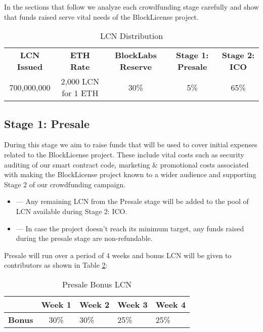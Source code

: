 In the sections that follow we analyze each crowdfunding stage carefully and show that funds raised serve vital needs of the BlockLicense project.


\begin{table}[t]
\begin{center}
\begin{tabular}{c c c c c}
& & \\ %
\toprule
\textbf{LCN Issued} & \textbf{ETH Rate} & \textbf{BlockLabs Reserve}  & \textbf{Stage 1: Presale} & \textbf{Stage 2: ICO} \\
\midrule
700,000,000 & 2,000 LCN for 1 ETH & 30\% & 5\% & 65\% \\
\bottomrule
\end{tabular}
\end{center}
\caption{LCN Distribution}
\label{table:coindistribution}
\end{table}



\subsection{Stage 1: Presale}


During this stage we aim to raise funds that will be used to cover initial expenses related to the BlockLicense project. These include vital costs such as security auditing of our smart contract code, marketing \& promotional costs associated with making the BlockLicense project known to a wider audience and supporting Stage 2 of our crowdfunding campaign.


\begin{itemize}
\item --- Any remaining LCN from the Presale stage will be added to the pool of LCN available during Stage 2: ICO.
\item --- In case the project doesn't reach its minimum target, any funds raised during the presale stage are non-refundable. 
\end{itemize}

Presale will run over a period of 4 weeks and bonus LCN will be given to contributors as shown in Table \ref{presale-bonus}:

\begin{table}[h]
\centering
\begin{tabular}{@{}lclll@{}}
\toprule
& \textbf{Week 1} & \multicolumn{1}{c}{\textbf{Week 2}} & \multicolumn{1}{c}{\textbf{Week 3}} & \multicolumn{1}{c}{\textbf{Week 4}} \\ 
\midrule
\multicolumn{1}{r}{\textbf{Bonus}} & 30\%            & 30\%                                & 25\%                                & 25\%   \\ 
\bottomrule
\end{tabular}
\caption{Presale Bonus LCN}
\label{presale-bonus}
\end{table}

